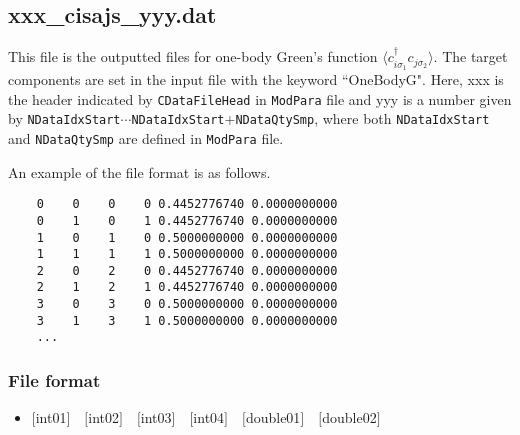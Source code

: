 \subsection{xxx\_cisajs\_yyy.dat }
This file is the outputted files for one-body Green's function $\langle c_{i\sigma_1}^{\dagger}c_{j\sigma_2}\rangle$. 
The target components are set in the input file with the keyword ``OneBodyG".
Here, xxx is the header indicated by \verb|CDataFileHead| in \verb|ModPara| file and yyy is a number given by \verb|NDataIdxStart|$\cdots$\verb|NDataIdxStart|+\verb|NDataQtySmp|, where both \verb|NDataIdxStart| and \verb|NDataQtySmp| are defined in \verb|ModPara| file.

An example of the file format is as follows.

\begin{minipage}{12.5cm}
\begin{screen}
\begin{verbatim}
    0    0    0    0 0.4452776740 0.0000000000
    0    1    0    1 0.4452776740 0.0000000000
    1    0    1    0 0.5000000000 0.0000000000
    1    1    1    1 0.5000000000 0.0000000000
    2    0    2    0 0.4452776740 0.0000000000
    2    1    2    1 0.4452776740 0.0000000000
    3    0    3    0 0.5000000000 0.0000000000
    3    1    3    1 0.5000000000 0.0000000000
    ...
\end{verbatim}
\end{screen}
\end{minipage}

\subsubsection{File format}
 \begin{itemize}
   \item  $[$int01$]$~~$[$int02$]$~~$[$int03$]$~~$[$int04$]$~~$[$double01$]$~~$[$double02$]$
  \end{itemize}
